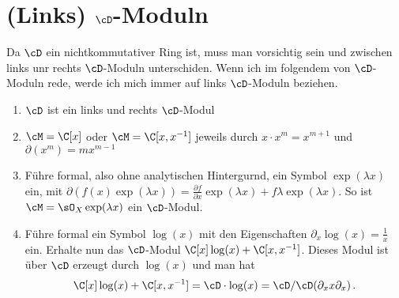 \section{(Links) $\cD$-Moduln}
Da $\cD$ ein nichtkommutativer Ring ist, muss man vorsichtig sein und zwischen
links unr rechts $\cD$-Moduln unterschiden. Wenn ich im folgendem von
$\cD$-Moduln rede, werde ich mich immer
auf links $\cD$-Moduln beziehen.

\begin{exmp}
\cite[Exmp 2.2]{ArkhipovDmod}
\begin{enumerate}
%
\item $\cD$ ist ein links und rechts $\cD$-Modul
%
\item $\cM=\C[x]$ oder $\cM=\C[x,x^{-1}]$ jeweils durch $x\cdot x^{m}=x^{m+1}$
und $\partial(x^m)=mx^{m-1}$
%
\item \cite[Exmp 2.2]{ArkhipovDmod}
Führe formal, also ohne analytischen Hintergurnd, ein Symbol
$\exp(\lambda x)$ ein, mit $\partial(f(x)\exp(\lambda x))=\frac{\partial
f}{\partial x}\exp(\lambda x)+f\lambda\exp(\lambda x)$.  So ist
$\cM=\sO_X\exp(\lambda x)$ ein $\cD$-Modul.
%
\item \cite[Exmp 3.1.4]{ginzburg}
Führe formal ein Symbol $\log(x)$ mit den Eigenschaften
$\partial_x\log(x)=\frac{1}{x}$ ein. Erhalte nun das $\cD$-Modul
$\C[x]\log(x)+\C[x,x^{-1}]$. Dieses Modul ist über $\cD$ erzeugt durch
$\log(x)$ und man hat
\[
\C[x]\log(x)+\C[x,x^{-1}]=\cD\cdot\log(x)=\cD\slash\cD(\partial_x x\partial_x) \,.
\]
%
\end{enumerate}
\end{exmp}

\begin{comment}
\begin{lem}\cite[Lem 2.3.3.]{sabbah_cimpa90}
Sei $\cM$ ein links $\cD$-Modul von endlichem Typ, welches auch von endlichem
Typ über $\Ckx$ ist. Dann ist $\cM$ bereits ein freies $\C\{x\}$-Modul.
\end{lem}
\begin{proof}
Siehe \cite[Lem 2.3.3.]{sabbah_cimpa90}.
\end{proof}
\begin{cor} \cite[Cor 2.3.4.]{sabbah_cimpa90}
Falls $\cM$ ein links $\cD$-Modul von endlichem typ, welches außerdem ein
endich dimensionaler Vektorraum ist, so ist schon $\cM=\{0\}$.
\end{cor}
\end{comment}

